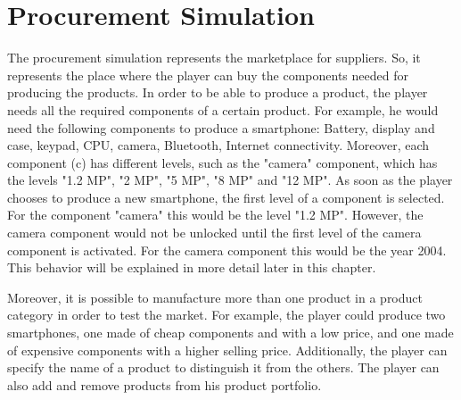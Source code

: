 \section{Procurement Simulation}
\label{procuresim}
The procurement simulation represents the marketplace for suppliers. So, it represents the place where the player can buy the components needed for producing the products. In order to be able to produce a product, the player needs all the required components of a certain product. For example, he would need the following components to produce a smartphone: Battery, display and case, keypad, CPU, camera, Bluetooth, Internet connectivity. Moreover, each component (\gls{c}) has different levels, such as the "camera" component, which has the levels "1.2 MP", "2 MP", "5 MP", "8 MP" and "12 MP".  As soon as the player chooses to produce a new smartphone, the first level of a component is selected. For the component "camera" this would be the level "1.2 MP". However, the camera component would not be unlocked until the first level of the camera component is activated. For the camera component this would be the year 2004. This behavior will be explained in more detail later in this chapter.

Moreover, it is possible to manufacture more than one product in a product category in order to test the market. For example, the player could produce two smartphones, one made of cheap components and with a low price, and one made of expensive components with a higher selling price. Additionally, the player can specify the name of a product to distinguish it from the others. The player can also add and remove products from his product portfolio.

